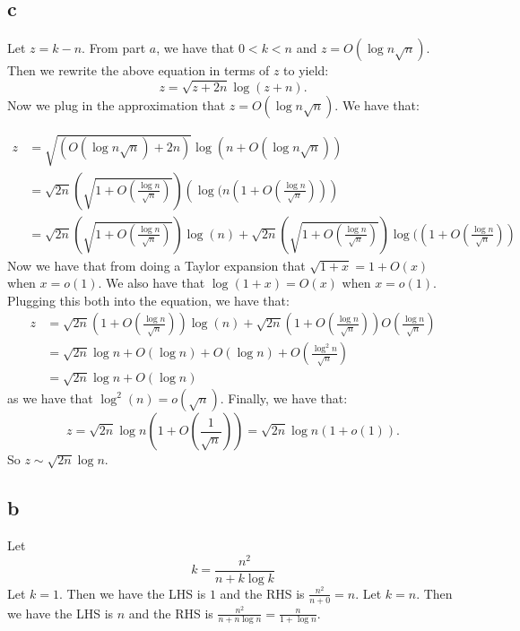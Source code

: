 \documentclass[]{article}
\begin{document}
\subsection{c}
Let $z = k - n$. From part $a$, we have that $0 < k < n$ and $z =  O(\log n \sqrt n)$. Then we rewrite the above equation in terms of $z$ to yield:
\begin{equation}
	z = \sqrt{z + 2n} \log (z + n).
\end{equation}
Now we plug in the approximation that $z = O(\log n \sqrt{n})$. We have that:

\begin{align*}
	z &= \sqrt{(O(\log n \sqrt{n}) + 2n)}\log(n + O(\log n \sqrt n))\\
	&= \sqrt{2n} \left(\sqrt{1 + O(\frac{\log n}{\sqrt{n}})}\right) \left(\log( n(1 + O(\frac{\log n}{\sqrt{n}} )) \right)\\
	&= \sqrt{2n}\left(\sqrt{1 + O(\frac{\log n}{\sqrt{n}})}\right) \log(n) + \sqrt{2n}\left(\sqrt{1 + O(\frac{\log n}{\sqrt{n}})}\right) \log((1 + O(\frac{\log n}{\sqrt{n}}))
	\end{align*}
Now we have that from doing a Taylor expansion that $\sqrt{1 + x} = 1 + O(x)$ when $x = o(1)$. We also have that $\log(1 + x) = O(x)$ when $x = o(1)$. Plugging this both into the equation, we have that:
\begin{align*}
	z &= \sqrt{2n}(1 + O(\frac{\log n}{\sqrt{n}})) \log(n) + \sqrt{2n}(1 + O(\frac{\log n}{\sqrt{n}}))O(\frac{\log n}{\sqrt{n}})\\
	&= \sqrt{2n} \log n + O(\log n) + O(\log n) + O(\frac{\log^2 n}{\sqrt{n}})\\
	&= \sqrt{2n} \log n + O(\log n)
\end{align*}
as we have that $\log^2(n) = o(\sqrt{n})$. Finally, we have that:
\begin{equation}
	z = \sqrt{2n} \log n ( 1 + O(\frac{1}{\sqrt{n}})) = \sqrt{2n} \log n (1 + o(1)).
\end{equation}
So $z \sim \sqrt{2n} \log n$.

\subsection{b}
Let
\begin{equation}
	k = \frac{n^2}{n + k \log k}
\end{equation}
Let $k = 1$. Then we have the LHS is $1$ and the RHS is $\frac{n^2}{n + 0} = n$. Let $k = n$. Then we have the LHS is $n$ and the RHS is $\frac{n^2}{n + n \log n} = \frac{n}{1 + \log n}$.
\end{document}
